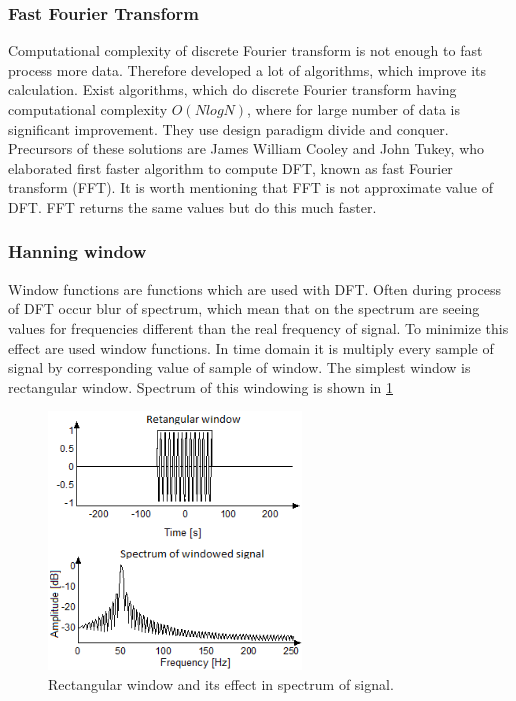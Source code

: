 \documentclass[11pt,titlepage]{article}
\theoremstyle{plain}
\begin{document}
\subsubsection{Fast Fourier Transform}
Computational complexity of discrete Fourier transform is not enough to fast process more data. Therefore developed a lot of algorithms, which improve its calculation. Exist algorithms, which do discrete Fourier transform having computational complexity $O(NlogN)$, where for large number of data is significant improvement. They use design paradigm divide and conquer. Precursors of these solutions are James William Cooley and John Tukey, who elaborated first faster algorithm to compute DFT, known as fast Fourier transform (FFT). It is worth mentioning that FFT is not approximate value of DFT. FFT returns the same values but do this much faster.

\subsubsection{Hanning window}
Window functions are functions which are used with DFT. Often during process of DFT occur blur of spectrum, which mean that on the spectrum are seeing values for frequencies different than the real frequency of signal. To minimize this effect are used window functions. In time domain it is multiply every sample of signal by corresponding value of sample of window. The simplest window is rectangular window. Spectrum of this windowing is shown in \ref{fig:F9}
\begin{figure}[H]
	\centering
	\includegraphics[width=0.6\textwidth]{img/rectangular_window}
	\caption{Rectangular window and its effect in spectrum of signal.}
	\label{fig:F9}
\end{figure}
\end{document}
